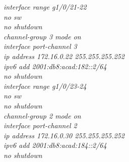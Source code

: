 \documentclass[12pt,a4paper]{report}
\begin{document}
\hspace*{2cm}\textit{interface range g1/0/21-22\\
\hspace*{2cm}no sw\\
\hspace*{2cm}no shutdown\\
\hspace*{2cm}channel-group 3 mode on \\
\hspace*{2cm}interface port-channel 3\\
\hspace*{2cm}ip address 172.16.0.22 255.255.255.252\\
\hspace*{2cm}ipv6 add 2001:db8:acad:182::2/64\\
\hspace*{2cm}no shutdown\\
\hspace*{2cm}interface range g1/0/23-24\\
\hspace*{2cm}no sw\\
\hspace*{2cm}no shutdown\\
\hspace*{2cm}channel-group 2 mode on \\
\hspace*{2cm}interface port-channel 2\\
\hspace*{2cm}ip address 172.16.0.30 255.255.255.252\\
\hspace*{2cm}ipv6 add 2001:db8:acad:184::2/64\\
\hspace*{2cm}no shutdown\\}
\end{document}
